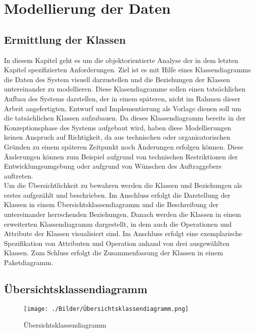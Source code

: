 \section{Modellierung der Daten}
\subsection{Ermittlung der Klassen}
In diesem Kapitel geht es um die objektorientierte Analyse der in dem letzten Kapitel spezifizierten Anforderungen. Ziel ist es mit Hilfe eines Klassendiagramms die Daten des System visuell darzustellen und die Beziehungen der Klassen untereinander zu modellieren. Diese Klasendiagramme sollen einen tatsächlichen Aufbau des Systems darstellen, der in einem späteren, nicht im Rahmen dieser Arbeit angefertigten, Entwurf und Implementierung als Vorlage dienen soll um die tatsächlichen Klassen aufzubauen. Da dieses Klassendiagramm bereits in der Konzeptionsphase des Systems aufgebaut wird, haben diese Modellierungen keinen Anspruch auf Richtigkeit, da aus technischen oder organisatorischen Gründen zu einem späteren Zeitpunkt noch Änderungen erfolgen können. Diese Änderungen können zum Beispiel aufgrund von technischen Restriktionen der Entwicklungsumgebung oder aufgrund von Wünschen des Auftraggebers auftreten.
\\Um die Übersichtlichkeit zu bewahren werden die Klassen und Beziehungen als erstes aufgezählt und beschrieben. Im Anschluss erfolgt die Darstellung der Klassen in einem Übersichtsklassendiagramm und die Beschreibung der untereinander herrschenden Beziehungen. Danach werden die Klassen in einem erweiterten Klassendiagramm dargestellt, in dem auch die Operationen und Attribute der Klassen visualisiert sind. Im Anschluss erfolgt eine exemplarische Spezifikation von Attributen und Operation anhand von drei ausgewählten Klassen. Zum Schluss erfolgt die Zusammenfassung der Klassen in einem Paketdiagramm.    

\newpage

\subsection{Übersichtsklassendiagramm}
\begin{figure}[h!]
    \centering
    \texttt{[image: ./Bilder/Übersichtsklassendiagramm.png]}
    \caption[Übersichtsklassendiagramm]{Übersichtsklassendiagramm}
    \label{fig:Übersichtsklassendiagramm}
\end{figure}

